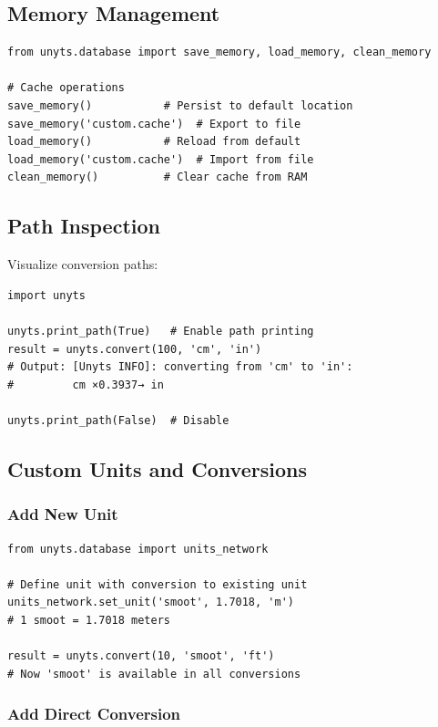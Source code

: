 \documentclass[11pt,a4paper]{report}
\begin{document}
\subsection{Memory Management}

\begin{lstlisting}[style=pythonstyle]
from unyts.database import save_memory, load_memory, clean_memory

# Cache operations
save_memory()           # Persist to default location
save_memory('custom.cache')  # Export to file
load_memory()           # Reload from default
load_memory('custom.cache')  # Import from file
clean_memory()          # Clear cache from RAM
\end{lstlisting}

\subsection{Path Inspection}

Visualize conversion paths:

\begin{lstlisting}[style=pythonstyle]
import unyts

unyts.print_path(True)   # Enable path printing
result = unyts.convert(100, 'cm', 'in')
# Output: [Unyts INFO]: converting from 'cm' to 'in': 
#         cm ×0.3937→ in

unyts.print_path(False)  # Disable
\end{lstlisting}

\subsection{Custom Units and Conversions}

\subsubsection{Add New Unit}

\begin{lstlisting}[style=pythonstyle]
from unyts.database import units_network

# Define unit with conversion to existing unit
units_network.set_unit('smoot', 1.7018, 'm')  
# 1 smoot = 1.7018 meters

result = unyts.convert(10, 'smoot', 'ft')
# Now 'smoot' is available in all conversions
\end{lstlisting}

\subsubsection{Add Direct Conversion}
\end{document}
